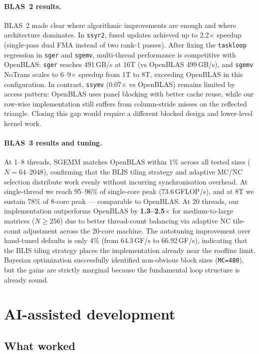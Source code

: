 \documentclass[11pt,a4paper]{article}
\begin{document}
\paragraph{BLAS~2 results.}
BLAS~2 made clear where algorithmic improvements are enough and where architecture dominates. In \texttt{ssyr2}, fused updates achieved up to 2.2$\times$ speedup (single-pass dual FMA instead of two rank-1 passes). After fixing the \texttt{taskloop} regression in \texttt{sger} and \texttt{sgemv}, multi-thread performance is competitive with OpenBLAS: \texttt{sger} reaches 491\,GB/s at 16T (vs OpenBLAS 499\,GB/s), and \texttt{sgemv} NoTrans scales to 6--9$\times$ speedup from 1T to 8T, exceeding OpenBLAS in this configuration. In contrast, \texttt{ssymv} (0.07$\times$ vs OpenBLAS) remains limited by access pattern: OpenBLAS uses panel blocking with better cache reuse, while our row-wise implementation still suffers from column-stride misses on the reflected triangle. Closing this gap would require a different blocked design and lower-level kernel work.

\paragraph{BLAS~3 results and tuning.}
At 1--8 threads, SGEMM matches OpenBLAS within 1\% across all tested sizes ($N = 64$--$2048$), confirming that the BLIS tiling strategy and adaptive MC/NC selection distribute work evenly without incurring synchronisation overhead. At single-thread we reach 95--96\% of single-core peak (73.6\,GFLOP/s), and at 8T we sustain 78\% of 8-core peak — comparable to OpenBLAS. At 20 threads, our implementation outperforms OpenBLAS by \textbf{1.3--2.5$\times$} for medium-to-large matrices ($N \ge 256$) due to better thread-count balancing via adaptive NC tile-count adjustment across the 20-core machine. The autotuning improvement over hand-tuned defaults is only 4\% (from 64.3\,GF/s to 66.92\,GF/s), indicating that the BLIS tiling strategy places the implementation already near the roofline limit. Bayesian optimization successfully identified non-obvious block sizes (\texttt{MC=480}), but the gains are strictly marginal because the fundamental loop structure is already sound.

\section{AI-assisted development}

\subsection*{What worked}
\end{document}
